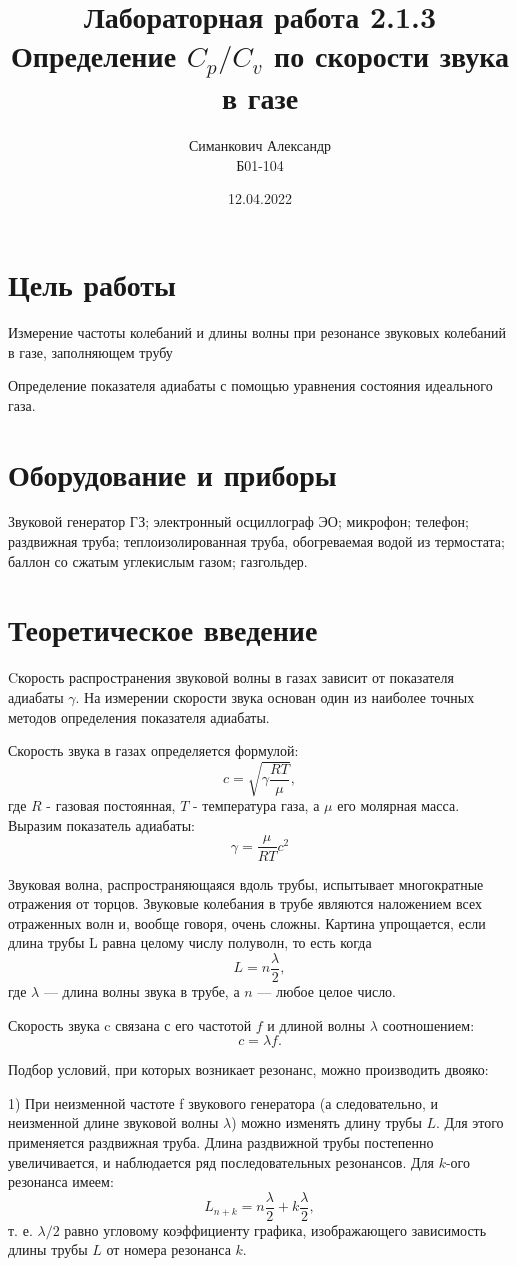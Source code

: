 \documentclass[12pt,a4paper]{article}
\title{Лабораторная работа 2.1.3\\ Определение $C_p/C_v$ по скорости звука в газе}
\author{Симанкович Александр \\ Б01-104}
\date{12.04.2022}
\begin{document}
	\maketitle
	
	\section*{Цель работы}
		
	Измерение частоты колебаний и длины волны при резонансе звуковых колебаний в газе, заполняющем трубу
	
	Определение показателя адиабаты с помощью уравнения состояния идеального газа.
	
	\section*{Оборудование и приборы} 
	Звуковой генератор ГЗ;
	электронный осциллограф ЭО;
	микрофон;
	телефон;
	раздвижная труба;
	теплоизолированная труба, обогреваемая водой из термостата;
	баллон со сжатым углекислым газом;
	газгольдер.
	
	\section*{Теоретическое введение}
	
		
	Cкорость распространения звуковой волны в газах зависит от показателя адиабаты $\gamma$.
	На измерении скорости звука основан один из наиболее  точных методов определения показателя  адиабаты.
	
	Скорость звука в газах определяется формулой:
	$$c=\sqrt{\gamma\frac{RT}{\mu}},$$
	где $R$ - газовая постоянная, $T$ - температура газа, а $\mu$ его молярная масса.
	Выразим показатель адиабаты:
	$$\gamma=\frac{\mu}{RT} c^2$$
	
	Звуковая волна, распространяющаяся вдоль трубы, испытывает многократные отражения от торцов.
	Звуковые колебания в трубе являются наложением всех отраженных волн и, вообще говоря, очень сложны.
	Картина упрощается, если длина трубы L равна целому числу полуволн, то есть когда
	$$L=n\frac{\lambda}{2},$$
	где $\lambda$ — длина волны звука в трубе, а $n$ — любое целое число.
	
	Скорость звука c связана с его частотой $f$ и длиной волны $\lambda$ соотношением:
	$$c=\lambda f.$$
	
	Подбор условий, при которых возникает резонанс, можно производить двояко:
	
	1) При неизменной частоте f звукового генератора (а следовательно, и неизменной длине звуковой волны $\lambda$) можно изменять длину трубы $L$.
	Для этого применяется раздвижная труба.
	Длина раздвижной трубы постепенно увеличивается, и наблюдается ряд последовательных резонансов.
	Для $k$-ого резонанса имеем:
	$$L_{n+k}=n\frac{\lambda}{2} + k\frac{\lambda}{2},$$
	т. е. $\lambda/2$ равно угловому коэффициенту графика, изображающего зависимость длины трубы $L$ от номера резонанса $k$.
	
\end{document}
